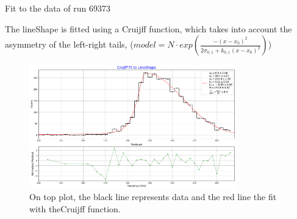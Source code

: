 \documentclass[9pt]{beamer}
\begin{document}
\begin{frame}{Fit to the data of run 69373}

The lineShape is fitted using a Cruijff function, which takes into account the asymmetry of the left-right tails, ($model = N \cdot exp(  \frac{-(x - x_{0})^2}{2\sigma_{0,1} + k_{0,1}(x - x_{0})^{2}})$) 

\begin{figure}[hbtp]
\centering
\includegraphics[width = 0.8\textwidth ]{../Plot/FitToLineShape.pdf}
\caption{On top plot, the black line represents data and the red line the fit with the\newline Cruijff function.}
\end{figure}
\end{frame}
\end{document}
